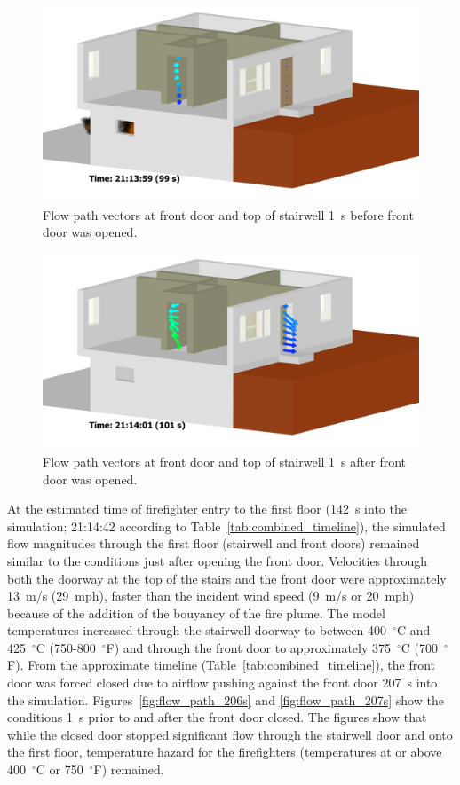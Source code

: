 \documentclass[12pt,oneside]{book}
\begin{document}
\begin{figure}[!ht]
\includegraphics[trim = 2.5in 0in 4in 0in, clip=true, width=.65\textwidth]{../Figures/flow_vector_99s}


\caption[Flow path vectors at front door and top of stairwell 1~s before front door was opened]
{Flow path vectors at front door and top of stairwell 1~s before front door was opened.}
\label{fig:flow_path_99s}
\end{figure}

\begin{figure}[!ht]
\includegraphics[trim = 2.5in 0in 4in 0in, clip=true, width=.65\textwidth]{../Figures/flow_vector_101s}


\caption[Flow path vectors at front door and top of stairwell 1~s after front door was opened]
{Flow path vectors at front door and top of stairwell 1~s after front door was opened.}
\label{fig:flow_path_101s} 
\end{figure}

\clearpage

At the estimated time of firefighter entry to the first floor (142~s into the simulation; 21:14:42 according to Table~\ref{tab:combined_timeline}), the simulated flow magnitudes through the first floor (stairwell and front doors) remained similar to the conditions just after opening the front door. Velocities through both the doorway at the top of the stairs and the front door were approximately 13~m/s (29~mph), faster than the incident wind  speed (9~m/s or 20~mph) because of the addition of the bouyancy of the fire plume. The model temperatures increased through the stairwell doorway to between 400~$^{\circ}$C and 425~$^{\circ}$C (750-800~$^{\circ}$F) and through the front door to approximately 375~$^{\circ}$C (700~$^{\circ}$F). From the approximate timeline (Table~\ref{tab:combined_timeline}), the front door was forced closed due to airflow pushing against the front door 207~s into the simulation. Figures~\ref{fig:flow_path_206s} and \ref{fig:flow_path_207s} show the conditions 1~s prior to and after the front door closed. The figures show that while the closed door stopped significant flow through the stairwell door and onto the first floor, temperature hazard for the firefighters (temperatures at or above 400~$^{\circ}$C or 750~$^{\circ}$F) remained.
\end{document}

